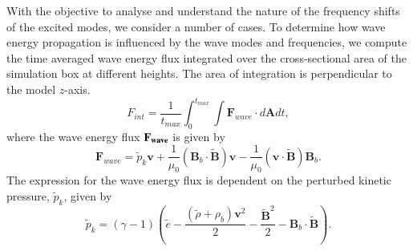 \documentclass[preprint,authoryear,12pt]{elsarticle}
\begin{document}

With the objective to analyse and understand the nature of the frequency shifts of the excited modes, we consider a number of cases.  To determine how wave energy propagation is influenced by the wave modes and frequencies, we compute the time averaged wave energy flux integrated over the cross-sectional area of the simulation box at different heights. The area of integration is perpendicular to the model $z$-axis.
\begin{equation}
F_{int}= \frac{1}{t_{max}} \int_{0}^{t_{max}} \int {\mathbf F}_{wave} \cdot d{\mathbf A}dt,
\label{e11}
\end{equation}
where the wave energy flux $\bf{F}_{wave}$ is given by
$$
{\mathbf F}_{wave}=\tilde{p}_{k} {\mathbf v}+\frac{1}{\mu_{0}}\left({\mathbf B}_{b}\cdot \tilde{{\mathbf B}}\right){\mathbf v}-\frac{1}{\mu_{0}}
\left({\mathbf v}\cdot \tilde{\mathbf B}\right){\mathbf B}_{b}.
$$
The expression for the wave energy flux is dependent on the perturbed kinetic pressure, $\tilde{p}_{k}$, given by \citet{Bogdan2003}
$$
\tilde{p}_{k}=\left(\gamma - 1\right)\left( \tilde{e}-\frac{ \left( \tilde{\rho} +\rho_b \right){\mathbf v}^2}{2}-\frac{{\tilde {\mathbf B}}^2}{2}-{\mathbf B}_b \cdot  \tilde{\mathbf B}\right).
$$
\end{document}
